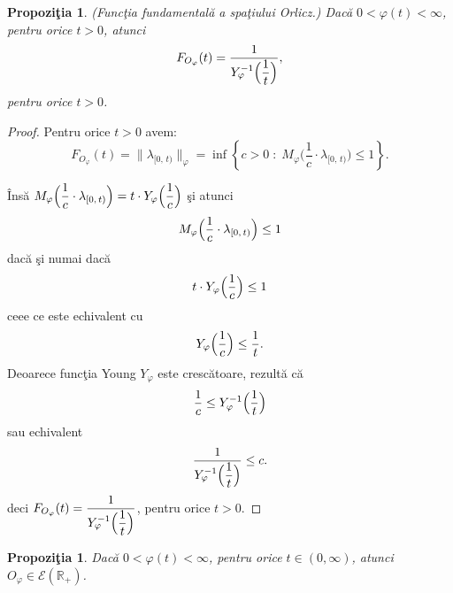 \documentclass[ a4paper, 12pt]{report}
\newtheorem{prop}[theorem]{\bf Propozi\c tia }
\theoremstyle{definition}
\theoremstyle{remark}
\numberwithin{equation}{section}
\begin{document}
\begin{prop}{\rm (Func\c tia fundamental\u a a spa\c tiului Orlicz.)}
Dac\u a $0 < \varphi(t) < \infty$, pentru orice $t > 0$, atunci
$$F_{O_\varphi}(t) = \displaystyle\frac{1}{Y_\varphi^{-1}\Big(\displaystyle\frac{1}{t}\Big)},$$ pentru orice $t > 0$.
\end{prop}

\begin{proof} Pentru orice $t > 0$ avem:
$$F_{O_\varphi}(t) = \lVert \lambda_{[0,\, t)}\rVert_\varphi = \inf\left\{ c > 0 \; : \; M_\varphi\Big( \frac{1}{c} \cdot \lambda_{[0,\, t)}\Big) \leq 1 \right\}.$$

\^Ins\u a $M_\varphi\Big(\displaystyle\frac{1}{c} \cdot \lambda_{[0,\, t)}\Big) = t \cdot Y_\varphi \Big(\displaystyle\frac{1}{c}\Big)$ \c si atunci
$$M_\varphi\Big(\displaystyle\frac{1}{c} \cdot \lambda_{[0,\, t)}\Big) \leq 1 $$ dac\u a \c si numai dac\u a
$$t \cdot Y_\varphi\Big (\displaystyle\frac{1}{c}\Big) \leq 1$$ ceee ce este echivalent cu
$$Y_\varphi\Big(\displaystyle\frac{1}{c}\Big) \leq \displaystyle\frac{1}{t}.$$ Deoarece func\c tia Young $Y_\varphi$ este cresc\u atoare, rezult\u a c\u a
$$\displaystyle\frac{1}{c} \leq Y_\varphi^{-1}\Big(\displaystyle\frac{1}{t}\Big)$$ sau echivalent
$$\displaystyle\frac{1}{Y_\varphi^{-1}\Big(\displaystyle\frac{1}{t}\Big)} \leq c.$$ deci $F_{O_\varphi}(t) = \displaystyle\frac{1}{Y_\varphi^{-1}\Big(\displaystyle\frac{1}{t}\Big)}$, pentru orice $t > 0$.
\end{proof}

\begin{prop}
Dac\u a $0 < \varphi(t) < \infty$, pentru orice $t \in (0,\infty)$, atunci $O_\varphi \in \mathcal{E}(\mathbb{R}_+)$.
\end{prop}
\end{document}

